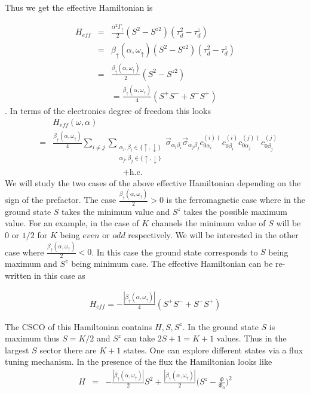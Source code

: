 \documentclass[reprint,prb,superscriptaddress]{revtex4-1}
\begin{document}
Thus we get the effective Hamiltonian is 

\begin{eqnarray}
H_{eff} &=& \frac{\alpha^2 \Gamma_{\uparrow}}{2} (S^2-S^{z2})(\tau^2_{d}-\tau^z_d)  \nonumber\\
&=& \beta_{\uparrow}(\alpha,\omega_{\uparrow})(S^2-S^{z2})(\tau^2_{d}-\tau^z_d)\\
&=& \frac{\beta_{\uparrow}(\alpha,\omega_{\uparrow})}{2} (S^2-S^{z2})  \nonumber\\
&& =\frac{\beta_{\uparrow}(\alpha,\omega_{\uparrow})}{4} (S^+S^-+S^-S^+)   
\end{eqnarray}
. In terms of the electronics degree of freedom this looks 
\begin{eqnarray}
&&H_{eff}(\omega,\alpha)  \nonumber\\
&=& \frac{ \beta_{\uparrow}(\alpha,\omega_{\uparrow}) }{4}    \displaystyle\sum_{i\neq j}\displaystyle\sum_{\substack{ \alpha_i,\beta_i\in \{\uparrow,\downarrow\}\\ \alpha_j,\beta_j\in \{\uparrow,\downarrow\}}}\vec{\sigma}_{\alpha_i\beta_i}\vec{\sigma}_{\alpha_j\beta_j}  c_{0\alpha_i}^{(i)\dagger}  c_{0\beta_i}^{(i)}    c_{0\alpha_j}^{(j)\dagger}  c_{0\beta_j}^{(j)}\nonumber\\
&&~~~~ ~~~~~~~~~~~~~~~~~~~~~~~~~~~~~~~~~~ +\textrm{h.c.}   
\label{eq:all-to-all_1}
\end{eqnarray}
We will study the two cases of the above effective Hamiltonian depending on the sign of the prefactor. The case $\frac{\beta_{\uparrow}(\alpha,\omega_{\uparrow})}{2} >0$ is the ferromagnetic case where in the ground state $S$ takes the minimum value and $S^z$ takes the possible maximum value. For an example, in the case of $K$ channels the minimum value of $S$ will be $0$ or $1/2$ for $K$ being $even $ or $odd$ respectively.  We will be interested in the other case where $\frac{\beta_{\uparrow}(\alpha,\omega_{\uparrow})}{2} <0$. In this case the ground state corresponds to $S$ being maximum and $S^z$ being minimum case. The effective Hamiltonian can be re-written in this case as

\begin{eqnarray}
H_{eff}   =-\frac{|\beta_{\uparrow}(\alpha,\omega_{\uparrow})|}{4} (S^+S^{-}+ S^-S^{+})    
\end{eqnarray}

\noindent The CSCO of this Hamiltonian contains $H,S,S^z$. In the ground state $S$ is maximum thus $S=K/2$ and $S^z$ can take $2S+1=K+1$ values. Thus in the largest $S$ sector there are $K+1$ states. One can explore different states via a flux tuning mechanism. In the presence of the flux the Hamiltonian looks like
\begin{eqnarray}
H &=& -\frac{|\beta_{\uparrow}(\alpha,\omega_{\uparrow})|}{2} S^2   +\frac{|\beta_{\uparrow}(\alpha,\omega_{\uparrow})|}{2} \bigg(S^{z}-\frac{\Phi}{\Phi_0} \bigg)^2 
\label{eq:flux_spectral}
\end{eqnarray}
\end{document}
